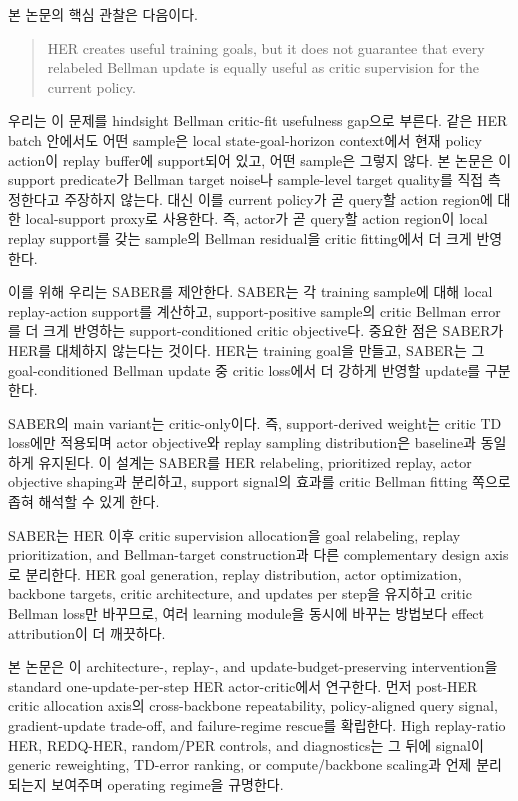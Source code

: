 \documentclass[letterpaper]{article}
\begin{document}
본 논문의 핵심 관찰은 다음이다.

\begin{quote}
HER creates useful training goals, but it does not guarantee that every relabeled Bellman update is equally useful as critic supervision for the current policy.
\end{quote}

우리는 이 문제를 hindsight Bellman critic-fit usefulness gap으로 부른다. 같은 HER batch 안에서도 어떤 sample은 local state-goal-horizon context에서 현재 policy action이 replay buffer에 support되어 있고, 어떤 sample은 그렇지 않다. 본 논문은 이 support predicate가 Bellman target noise나 sample-level target quality를 직접 측정한다고 주장하지 않는다. 대신 이를 current policy가 곧 query할 action region에 대한 local-support proxy로 사용한다. 즉, actor가 곧 query할 action region이 local replay support를 갖는 sample의 Bellman residual을 critic fitting에서 더 크게 반영한다.

이를 위해 우리는 SABER를 제안한다. SABER는 각 training sample에 대해 local replay-action support를 계산하고, support-positive sample의 critic Bellman error를 더 크게 반영하는 support-conditioned critic objective다. 중요한 점은 SABER가 HER를 대체하지 않는다는 것이다. HER는 training goal을 만들고, SABER는 그 goal-conditioned Bellman update 중 critic loss에서 더 강하게 반영할 update를 구분한다.

SABER의 main variant는 critic-only이다. 즉, support-derived weight는 critic TD loss에만 적용되며 actor objective와 replay sampling distribution은 baseline과 동일하게 유지된다. 이 설계는 SABER를 HER relabeling, prioritized replay, actor objective shaping과 분리하고, support signal의 효과를 critic Bellman fitting 쪽으로 좁혀 해석할 수 있게 한다.

SABER는 HER 이후 critic supervision allocation을 goal relabeling, replay prioritization, and Bellman-target construction과 다른 complementary design axis로 분리한다. HER goal generation, replay distribution, actor optimization, backbone targets, critic architecture, and updates per step을 유지하고 critic Bellman loss만 바꾸므로, 여러 learning module을 동시에 바꾸는 방법보다 effect attribution이 더 깨끗하다.

본 논문은 이 architecture-, replay-, and update-budget-preserving intervention을 standard one-update-per-step HER actor-critic에서 연구한다. 먼저 post-HER critic allocation axis의 cross-backbone repeatability, policy-aligned query signal, gradient-update trade-off, and failure-regime rescue를 확립한다. High replay-ratio HER, REDQ-HER, random/PER controls, and diagnostics는 그 뒤에 signal이 generic reweighting, TD-error ranking, or compute/backbone scaling과 언제 분리되는지 보여주며 operating regime을 규명한다.
\end{document}
